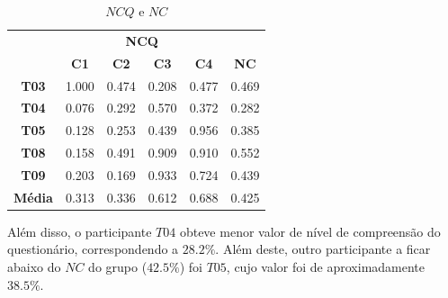 \begin{table}[htbp]
	\centering
	\caption{$NCQ$ e $NC$}
	\begin{tabular}{|c|cccc|c|}
		\hline
		\rowcolor[HTML]{D9D9D9} 
		\cellcolor[HTML]{D9D9D9} & \multicolumn{4}{c|}{\cellcolor[HTML]{D9D9D9}\textbf{NCQ}} & \cellcolor[HTML]{D9D9D9} \\ \cline{2-5}
		\rowcolor[HTML]{D9D9D9} 
		\multirow{-2}{*}{\cellcolor[HTML]{D9D9D9}\textbf{Participante}} & \multicolumn{1}{c|}{\cellcolor[HTML]{D9D9D9}\textbf{C1}} & \multicolumn{1}{c|}{\cellcolor[HTML]{D9D9D9}\textbf{C2}} & \multicolumn{1}{c|}{\cellcolor[HTML]{D9D9D9}\textbf{C3}} & \textbf{C4} & \multirow{-2}{*}{\cellcolor[HTML]{D9D9D9}\textbf{NC}} \\ \hline
		\rowcolor[HTML]{FFFFFF} 
		\textbf{T03} & \multicolumn{1}{c|}{\cellcolor[HTML]{FFFFFF}1.000} & \multicolumn{1}{c|}{\cellcolor[HTML]{FFFFFF}0.474} & \multicolumn{1}{c|}{\cellcolor[HTML]{FFFFFF}0.208} & 0.477 & 0.469 \\ \hline
		\rowcolor[HTML]{E7E6E6} 
		\textbf{T04} & \multicolumn{1}{c|}{\cellcolor[HTML]{E7E6E6}0.076} & \multicolumn{1}{c|}{\cellcolor[HTML]{E7E6E6}0.292} & \multicolumn{1}{c|}{\cellcolor[HTML]{E7E6E6}0.570} & 0.372 & 0.282 \\ \hline
		\rowcolor[HTML]{FFFFFF} 
		\textbf{T05} & \multicolumn{1}{c|}{\cellcolor[HTML]{FFFFFF}0.128} & \multicolumn{1}{c|}{\cellcolor[HTML]{FFFFFF}0.253} & \multicolumn{1}{c|}{\cellcolor[HTML]{FFFFFF}0.439} & 0.956 & 0.385 \\ \hline
		\rowcolor[HTML]{E7E6E6} 
		\textbf{T08} & \multicolumn{1}{c|}{\cellcolor[HTML]{E7E6E6}0.158} & \multicolumn{1}{c|}{\cellcolor[HTML]{E7E6E6}0.491} & \multicolumn{1}{c|}{\cellcolor[HTML]{E7E6E6}0.909} & 0.910 & 0.552 \\ \hline
		\rowcolor[HTML]{FFFFFF} 
		\textbf{T09} & \multicolumn{1}{c|}{\cellcolor[HTML]{FFFFFF}0.203} & \multicolumn{1}{c|}{\cellcolor[HTML]{FFFFFF}0.169} & \multicolumn{1}{c|}{\cellcolor[HTML]{FFFFFF}0.933} & 0.724 & 0.439 \\ \hline
		\rowcolor[HTML]{D9D9D9} 
		\textbf{Média} & \multicolumn{1}{c|}{\cellcolor[HTML]{D9D9D9}0.313} & \multicolumn{1}{c|}{\cellcolor[HTML]{D9D9D9}0.336} & \multicolumn{1}{c|}{\cellcolor[HTML]{D9D9D9}0.612} & 0.688 & 0.425 \\ \hline
	\end{tabular}
	\label{tab:F3_A5_NCQ}
\end{table}

Além disso, o participante $T04$ obteve menor valor de nível de compreensão do questionário, correspondendo a $28.2\%$. Além deste, outro participante a ficar abaixo do $NC$ do grupo ($42.5\%$) foi $T05$, cujo valor foi de aproximadamente $38.5\%$.

